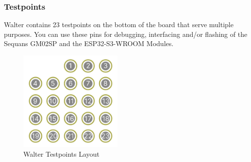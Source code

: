 \documentclass[11pt]{article}
\begin{document}
\subsubsection{Testpoints} \label{testpoints}
Walter contains 23 testpoints on the bottom of the board that serve multiple purposes. You can use these pins for debugging, interfacing and/or flashing of the Sequans GM02SP and the ESP32-S3-WROOM Modules.
\begin{figure}[h]
    \centering
    \includegraphics[height=5cm]{testpoints.png}
    \caption{Walter Testpoints Layout}
    \label{fig:testpoints}
\end{figure}
\end{document}
